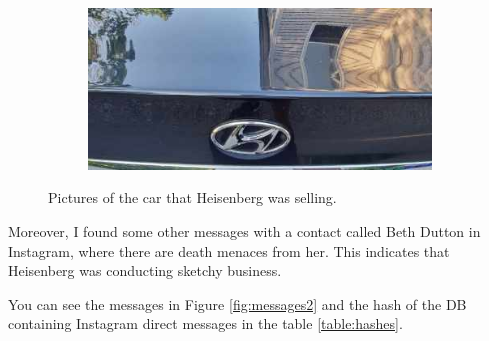 \documentclass[12pt]{article}
\begin{document}
\begin{figure}[!ht]
\begin{subfigure}[b]{0.3\textwidth}
        \caption{}
    \end{subfigure} \\
    \vspace{3 pt}
    \begin{subfigure}[b]{0.6\textwidth}
        \centering
        \includegraphics[width=\textwidth]{images/car3.png}
        \caption{}
    \end{subfigure}
    \caption{Pictures of the car that Heisenberg was selling.}
    \label{fig:cars}
\end{figure}

Moreover, I found some other messages with a contact called Beth Dutton in Instagram, where there are death menaces from her. This indicates that Heisenberg was conducting sketchy business. 

You can see the messages in Figure \ref{fig:messages2} and the hash of the DB containing Instagram direct messages in the table \ref{table:hashes}.
\end{document}
